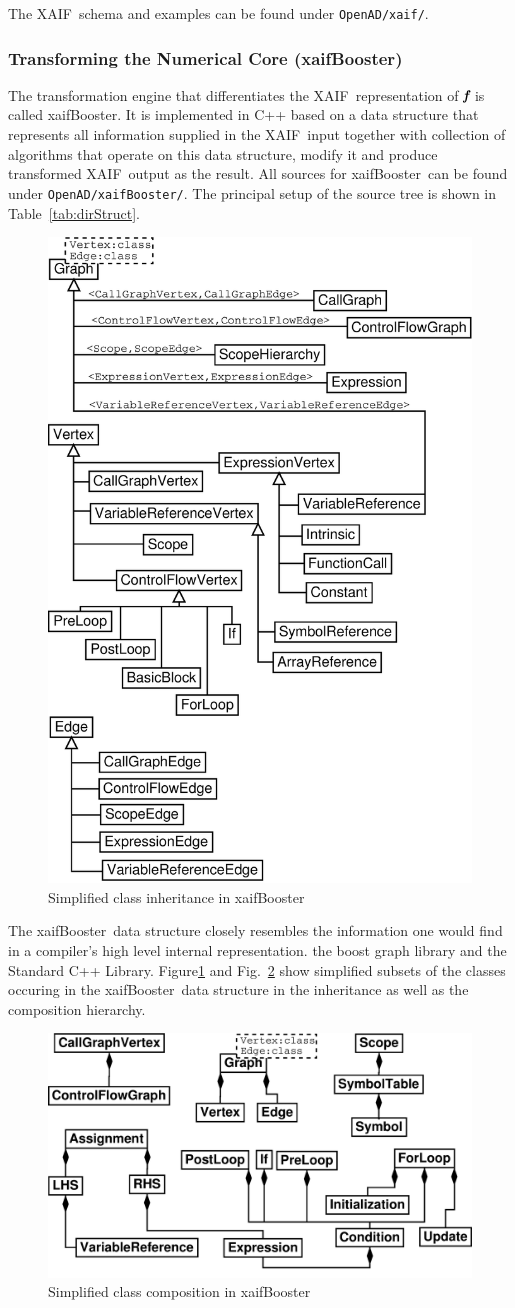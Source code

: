 \documentclass[11pt]{article}
\newcommand{\xaif}{XAIF}
\newcommand{\xaifBooster}{xaifBooster}
\newcommand{\bmf}{\mbox{\bf\em f}}
\newcommand{\code}[1]{{\small\tt{#1}}}
\newcommand{\reffig}[1]{{Fig.~\ref{#1}}}
\newcommand{\reffigBS}[1]{{Figure\ref{#1}}}
\newcommand{\reftab}[1]{{Table~\ref{#1}}}
\begin{document}
The \xaif\ schema and examples can be found under \code{OpenAD/xaif/}.

\subsubsection{Transforming the Numerical Core (\xaifBooster)} \label{sssec:xaifBooster}
The transformation engine that differentiates the \xaif\ representation of 
$\bmf$ is called \xaifBooster. It is implemented in C++ based on a 
data structure that represents all information supplied in the \xaif\ input 
together with collection of algorithms that operate on this data structure, modify 
it and produce transformed \xaif\ output as the result. All sources for \xaifBooster\ can be found under \code{OpenAD/xaifBooster/}. The principal setup of the source tree is shown in \reftab{tab:dirStruct}.
\begin{figure}
  \centering \includegraphics[width=.45\textwidth]{irInh}
  \caption{Simplified class inheritance in \xaifBooster} \label{fig:iri}
\end{figure}
The \xaifBooster\ data structure  
closely resembles the information one would find in a 
compiler's high level internal representation. 
the boost graph library \cite{boostWeb}
and the Standard C++ Library\cite{libstdcWeb}.
\reffigBS{fig:iri} and \reffig{fig:irc} show simplified subsets of the classes 
occuring in the \xaifBooster\ data structure in the inheritance 
as well as the composition hierarchy.  
\begin{figure}[htb]
  \centering \includegraphics[width=.45\textwidth]{irComp}
  \caption{Simplified class composition in \xaifBooster} \label{fig:irc}
\end{figure}
\end{document}
